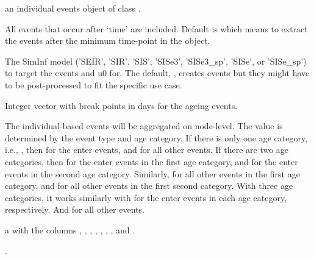\documentclass[letterpaper]{book}
\begin{document}
%
\begin{Arguments}
\begin{ldescription}
\item[\code{x}] an individual events object of class
.

\item[\code{time}] All events that occur after `time' are
included. Default is  which means to extract the
events after the minimum time-point in the
 object.

\item[\code{target}] The SimInf model ('SEIR', 'SIR', 'SIS', 'SISe3',
'SISe3\_sp', 'SISe', or 'SISe\_sp') to target the events and u0
for. The default, , creates events but they might
have to be post-processed to fit the specific use case.

\item[\code{age}] Integer vector with break points in days for the ageing
events.
\end{ldescription}
\end{Arguments}
%
\begin{Details}
The individual-based events will be aggregated on node-level.  The
 value is determined by the event type and age
category.  If there is only one age category, i.e.,
, then  for the enter events, and
 for all other events. If there are two age
categories, then  for the enter events in the first
age category, and  for the enter events in the
second age category. Similarly,  for all other
events in the first age category, and  for all
other events in the first second category. With three age
categories, it works similarly with  for the
enter events in each age category, respectively. And
 for all other events.
\end{Details}
%
\begin{Value}
a  with the columns ,
, , , ,
, , and .
\end{Value}
%
\begin{SeeAlso}
.
\end{SeeAlso}
\end{document}
